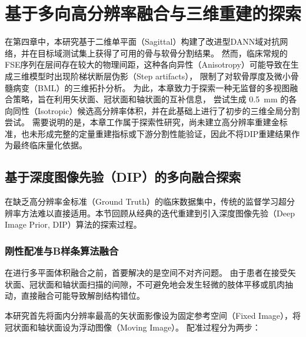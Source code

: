 
\chapter{基于多向高分辨率融合与三维重建的探索}
  在第四章中，本研究基于二维单平面（Sagittal）构建了改进型DANN域对抗网络，并在目标域测试集上获得了可用的骨与软骨分割结果。
  然而，临床常规的FSE序列在层间存在较大的物理间距，这种各向异性（Anisotropy）可能导致在生成三维模型时出现阶梯状断层伪影（Step artifacts），
  限制了对软骨厚度及微小骨髓病变（BML）的三维拓扑分析。
  为此，本章致力于探索一种无监督的多视图融合策略，旨在利用矢状面、冠状面和轴状面的互补信息，
  尝试生成 \qty{0.5}{\milli\metre} 的各向同性（Isotropic）候选高分辨率体积，并在此基础上进行了初步的三维全局分割尝试。
  需要说明的是，本章工作属于探索性研究，尚未建立高分辨率重建金标准，也未形成完整的定量重建指标或下游分割性能验证，因此不将DIP重建结果作为最终临床量化依据。

\section{基于深度图像先验（DIP）的多向融合探索}
  在缺乏高分辨率金标准（Ground Truth）的临床数据集中，传统的监督学习超分辨率方法难以直接适用。本节回顾从经典的迭代重建到引入深度图像先验（Deep Image Prior, DIP）算法的探索过程。
  \subsection{刚性配准与B样条算法融合}
    在进行多平面体积融合之前，首要解决的是空间不对齐问题。
    由于患者在接受矢状面、冠状面和轴状面扫描的间隙，不可避免地会发生轻微的肢体平移或肌肉抽动，直接融合可能导致解剖结构错位。
    \par 本研究首先将面内分辨率最高的矢状面影像设为固定参考空间（Fixed Image），将冠状面和轴状面设为浮动图像（Moving Image）。
    配准过程分为两步：
